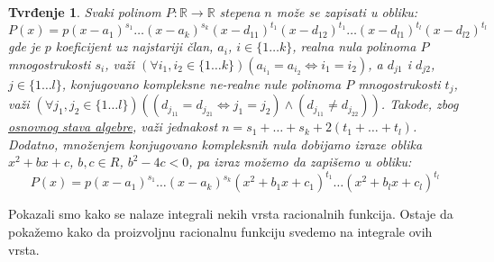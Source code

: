 \documentclass{article}
\newtheorem{tvr}{Tvrđenje}[section]
\begin{document}
\begin{tvrbox}
    \begin{tvr}\label{tvrđenje_1.1}
        Svaki polinom $P:\mathbb{R}\longrightarrow\mathbb{R}$ stepena $n$
        može se zapisati u obliku:
        $$P(x)=p(x-a_1)^{s_1}\dotsc(x-a_k)^{s_k}(x-d_{11})^{t_1}(x-d_{12})^{t_1}\dotsc(x-d_{l1})^{t_l}(x-d_{l2})^{t_l}$$
        gde je $p$ koeficijent uz najstariji član,
        $a_i$, $i\in\{1\dotsc k\}$, realna nula polinoma $P$ mnogostrukosti $s_i$, važi $(\forall i_1,i_2\in\{1\dotsc k\})(a_{i_1}=a_{i_2}\iff i_1=i_2)$,
        a $d_{j1}$ i $d_{j2}$,
        $j\in\{1\dotsc l\}$, konjugovano kompleksne ne-realne nule polinoma $P$
        mnogostrukosti $t_j$, važi $(\forall j_1,j_2\in\{1\dotsc l\})((d_{j_11}=d_{j_21}\iff j_1=j_2)\land(d_{j_11}\neq d_{j_22}))$.
        Takođe, zbog \hyperref[OSA]{osnovnog stava algebre}, važi jednakost $n=s_1+\dotsc+s_k+2(t_1+\dotsc+t_l)$. Dodatno,
        množenjem konjugovano kompleksnih nula dobijamo izraze oblika $x^2+bx+c$, $b,c\in{R}$, $b^2-4c<0$,
        pa izraz možemo da zapišemo u obliku:
        $$P(x)=p(x-a_1)^{s_1}\dotsc(x-a_k)^{s_k}(x^2+b_1x+c_1)^{t_1}\dotsc(x^2+b_lx+c_l)^{t_l}$$
    \end{tvr}
\end{tvrbox}

Pokazali smo kako se nalaze integrali nekih vrsta
racionalnih funkcija. Ostaje da pokažemo kako da
proizvoljnu racionalnu funkciju svedemo na
integrale ovih vrsta.
\end{document}
